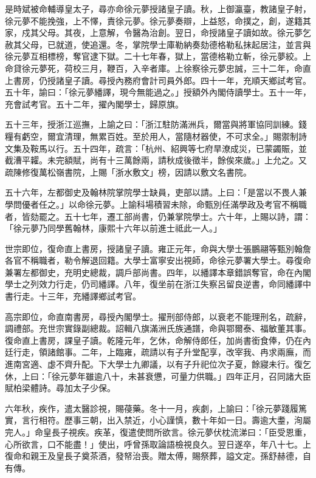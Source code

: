 \begin{pinyinscope}
是時斌被命輔導皇太子，尋亦命徐元夢授諸皇子讀。秋，上御瀛臺，教諸皇子射，徐元夢不能挽強，上不懌，責徐元夢。徐元夢奏辯，上益怒，命撲之，創，遂籍其家，戍其父母。其夜，上意解，令醫為治創。翌日，命授諸皇子讀如故。徐元夢乞赦其父母，已就道，使追還。冬，掌院學士庫勒納奏劾德格勒私抹起居注，並言與徐元夢互相標榜，奪官逮下獄。二十七年春，獄上，當德格勒立斬，徐元夢絞。上命貸徐元夢死，荷校三月，鞭百，入辛者庫。上徐察徐元夢忠誠，三十二年，命直上書房，仍授諸皇子讀。尋授內務府會計司員外郎。四十一年，充順天鄉試考官。五十年，諭曰：「徐元夢繙譯，現今無能過之。」授額外內閣侍讀學士。五十一年，充會試考官。五十二年，擢內閣學士，歸原旗。

五十三年，授浙江巡撫，上諭之曰：「浙江駐防滿洲兵，爾當與將軍協同訓練。錢糧有虧空，爾宜清理，無累百姓。至於用人，當隨材器使，不可求全。」賜禦制詩文集及鞍馬以行。五十四年，疏言：「杭州、紹興等七府旱潦成災，已蒙蠲賑，並截漕平糶。未完額賦，尚有十三萬餘兩，請秋成後徵半，餘俟來歲。」上允之。又疏陳修復萬松嶺書院，上賜「浙水敷文」榜，因請以敷文名書院。

五十六年，左都御史及翰林院掌院學士缺員，吏部以請。上曰：「是當以不畏人兼學問優者任之。」以命徐元夢。上諭科場積習未除，命甄別任滿學政及考官不稱職者，皆劾罷之。五十七年，遷工部尚書，仍兼掌院學士。六十年，上賜以詩，謂：「徐元夢乃同學舊翰林，康熙十六年以前進士祗此一人。」

世宗即位，復命直上書房，授諸皇子讀。雍正元年，命與大學士張鵬翮等甄別翰詹各官不稱職者，勒令解退回籍。大學士富寧安出視師，命徐元夢署大學士。尋復命兼署左都御史，充明史總裁，調戶部尚書。四年，以繙譯本章錯誤奪官，命在內閣學士之列效力行走，仍司繙譯。八年，復坐前在浙江失察呂留良逆書，命同繙譯中書行走。十三年，充繙譯鄉試考官。

高宗即位，命直南書房，尋授內閣學士。擢刑部侍郎，以衰老不能理刑名，疏辭，調禮部。充世宗實錄副總裁。詔輯八旗滿洲氏族通譜，命與鄂爾泰、福敏董其事。復命直上書房，課皇子讀。乾隆元年，乞休，命解侍郎任，加尚書銜食俸，仍在內廷行走，領諸館事。二年，上臨雍，疏請以有子升堂配享，改宰我、冉求兩廡，而進南宮適、虙不齊升配。下大學士九卿議，以有子升祀位次子夏，餘寢未行。復乞休，上曰：「徐元夢年雖逾八十，未甚衰憊，可量力供職。」四年正月，召同諸大臣賦柏梁體詩。尋加太子少保。

六年秋，疾作，遣太醫診視，賜葠藥。冬十一月，疾劇，上諭曰：「徐元夢踐履篤實，言行相符。歷事三朝，出入禁近，小心謹慎，數十年如一日。壽逾大耋，洵屬完人。」命皇長子視疾。疾革，復遣使問所欲言。徐元夢伏枕流涕曰：「臣受恩重，心所欲言，口不能盡！」使出，呼曾孫取論語檢視良久。翌日遂卒，年八十七。上復命和親王及皇長子奠茶酒，發帑治喪。贈太傅，賜祭葬，謚文定。孫舒赫德，自有傳。


\end{pinyinscope}
